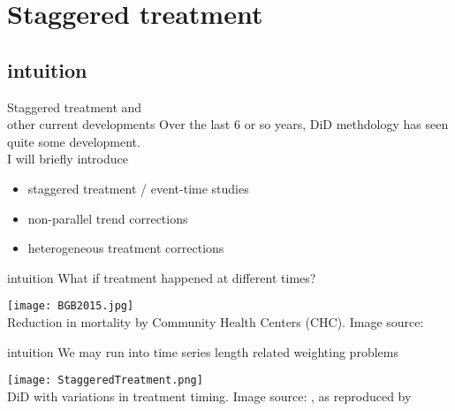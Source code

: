 \documentclass[aspectratio=169]{beamer}
\begin{document}
\section{Staggered treatment}

	\subsection{intuition}
		\begin{frame}{Staggered treatment and \\ other current developments}
			Over the last 6 or so years, DiD methdology has seen quite some development.
			\\ \vspace*{.25cm}
			I will briefly introduce
			\\ \vspace*{.25cm}
			\begin{itemize}
				\item<2-> staggered treatment / event-time studies
				\item<3-> non-parallel trend corrections
				\item<4-> heterogeneous treatment corrections
			\end{itemize}
		\end{frame}

		\begin{frame}{intuition}
			What if treatment happened at different times?
			\begin{center}
				\texttt{[image: BGB2015.jpg]}
				\\ \tiny{Reduction in mortality by Community Health Centers (CHC). Image source: \cite{Bailey2015}}
			\end{center}
		\end{frame}


		\begin{frame}{intuition}
			We may run into time series length related weighting problems
			\begin{center}
				\texttt{[image: StaggeredTreatment.png]}
				\\ \tiny{DiD with variations in treatment timing. Image source: \cite{Goodman-Bacon2021}, as reproduced by \href{https://andrewcbaker.netlify.app/2019/09/25/difference-in-differences-methodology/}{\underline{}}}
			\end{center}
		\end{frame}
\end{document}
